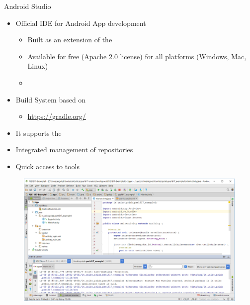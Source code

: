 \documentclass{beamer}
\begin{document}
  \begin{frame}[allowframebreaks]{Android Studio}
  \begin{itemize}\itemsep10pt
    \item Official IDE for Android App development
    \begin{itemize}
      \item Built as an extension of the 
      \item Available for free (Apache 2.0 license) for all platforms (Windows,
      Mac, Linux)
      \item {}
    \end{itemize}
    \item Build System based on  
    \begin{itemize}
      \item  \url{https://gradle.org/}
    \end{itemize}
      \item It supports the 
      \item Integrated management of  repositories
      \item Quick access to  tools
    \end{itemize}
    \begin{figure}
      \includegraphics[width=1\linewidth]{figures/android-studio-screenshot.png}
    \end{figure}
  \end{frame}
\end{document}
